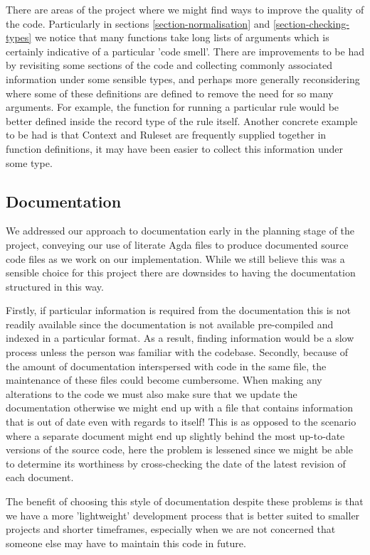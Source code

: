 There are areas of the project where we might find ways to
improve the quality of the code. Particularly in sections
\ref{section-normalisation} and \ref{section-checking-types} we notice
that many functions take long lists of arguments which is certainly
indicative of a particular 'code smell'. There are improvements to be
had by revisiting some sections of the code and collecting commonly
associated information under some sensible types, and perhaps more
generally reconsidering where some of these definitions are defined
to remove the need for so many arguments. For example, the function
for running a particular rule would be better defined inside the
record type of the rule itself. Another concrete example to be had is
that Context and Ruleset are frequently supplied together in
function definitions, it may have been easier to collect this
information under some type.

\subsection{Documentation}

We addressed our approach to documentation early in the planning stage
of the project, conveying our use of literate Agda files to produce
documented source code files as we work on our implementation. While we
still believe this was a sensible choice for this project there are
downsides to having the documentation structured in this way.

Firstly, if particular information is required from the documentation
this is not readily available since the documentation is not available
pre-compiled and indexed in a particular format. As a result, finding
information would be a slow process unless the person was familiar
with the codebase. Secondly, because of the amount of documentation
interspersed with code in the same file, the maintenance of these
files could become cumbersome. When making any alterations to the code
we must also make sure that we update the documentation otherwise we
might end up with a file that contains information that is out of date
even with regards to itself! This is as opposed to the scenario where a
separate document might end up slightly behind the most up-to-date
versions of the source code, here the problem is lessened since we
might be able to determine its worthiness by cross-checking the date
of the latest revision of each document.

The benefit of choosing this style of documentation despite
these problems is that we have a more 'lightweight' development
process that is better suited to smaller projects and shorter
timeframes, especially when we are not concerned that someone else
may have to maintain this code in future.

